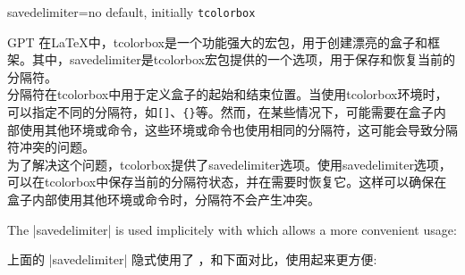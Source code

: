 \begin{docTcbKey}{savedelimiter}{=}{no default, initially \texttt{tcolorbox}}
\begin{引述之言}{GPT}
在LaTeX中，tcolorbox是一个功能强大的宏包，用于创建漂亮的盒子和框架。其中，savedelimiter是tcolorbox宏包提供的一个选项，用于保存和恢复当前的分隔符。
\\[0.5em]
分隔符在tcolorbox中用于定义盒子的起始和结束位置。当使用tcolorbox环境时，可以指定不同的分隔符，如\verb|[]|、\verb|{}|等。然而，在某些情况下，可能需要在盒子内部使用其他环境或命令，这些环境或命令也使用相同的分隔符，这可能会导致分隔符冲突的问题。
\\[0.5em]
为了解决这个问题，tcolorbox提供了savedelimiter选项。使用savedelimiter选项，可以在tcolorbox中保存当前的分隔符状态，并在需要时恢复它。这样可以确保在盒子内部使用其他环境或命令时，分隔符不会产生冲突。
\end{引述之言}


\enlargethispage*{1cm}

The |savedelimiter| is used implicitely with  which
allows a more convenient usage:

上面的 |savedelimiter| 隐式使用了 ，和下面对比，使用起来更方便:
\end{docTcbKey}